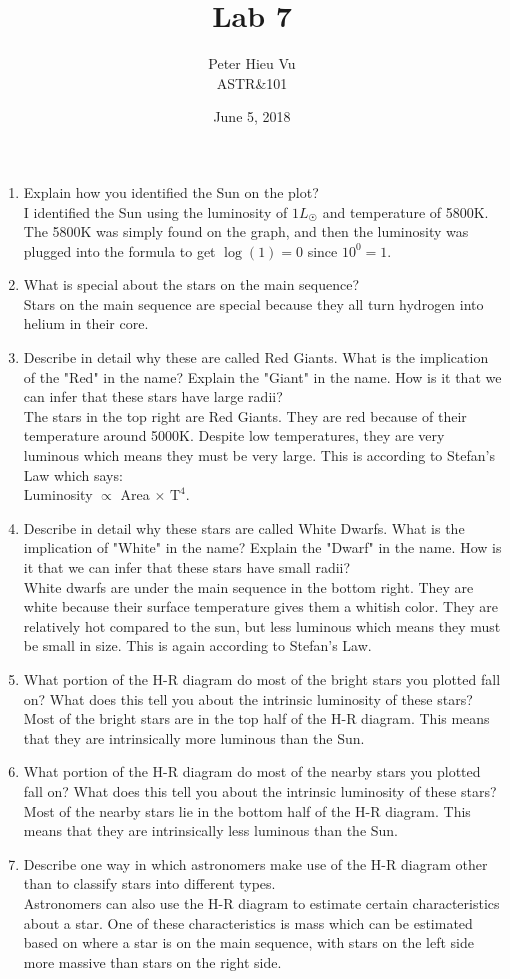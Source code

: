 \documentclass[12pt]{article}
\title{\vspace{-1.5cm}Lab 7}
\author{Peter Hieu Vu\\ASTR\&101}
\date{June 5, 2018}
\newcommand\lnend{\medskip\\}
\begin{document}
    \maketitle

    \begin{enumerate}
        \item Explain how you identified the Sun on the plot?\lnend{}
            I identified the Sun using the luminosity of $1L_{\Sun}$ and temperature of 5800K. The 5800K was simply found on the graph, and then the luminosity was plugged into the formula to get $\log (1) = 0$ since $10^0 = 1$.
        \item What is special about the stars on the main sequence?\lnend{}
            Stars on the main sequence are special because they all turn hydrogen into helium in their core.
        \item Describe in detail why these are called Red Giants. What is the implication of the "Red" in the name? Explain the "Giant" in the name. How is it that we can infer that these stars have large radii?\lnend{}
            The stars in the top right are Red Giants. They are red because of their temperature around 5000K. Despite low temperatures, they are very luminous which means they must be very large. This is according to Stefan's Law which says:\\Luminosity $\propto$ Area $\times$ $\mathrm{T}^4$.
        \item Describe in detail why these stars are called White Dwarfs. What is the implication of "White" in the name? Explain the "Dwarf" in the name. How is it that we can infer that these stars have small radii?\lnend{}
            White dwarfs are under the main sequence in the bottom right. They are white because their surface temperature gives them a whitish color. They are relatively hot compared to the sun, but less luminous which means they must be small in size. This is again according to Stefan's Law.
        \item What portion of the H-R diagram do most of the bright stars you plotted fall on? What does this tell you about the intrinsic luminosity of these stars?\lnend{}
            Most of the bright stars are in the top half of the H-R diagram. This means that they are intrinsically more luminous than the Sun.
        \item What portion of the H-R diagram do most of the nearby stars you plotted fall on? What does this tell you about the intrinsic luminosity of these stars?\lnend{}
            Most of the nearby stars lie in the bottom half of the H-R diagram. This means that they are intrinsically less luminous than the Sun.
        \item Describe one way in which astronomers make use of the H-R diagram other than to classify stars into different types.\lnend{}
            Astronomers can also use the H-R diagram to estimate certain characteristics about a star. One of these characteristics is mass which can be estimated based on where a star is on the main sequence, with stars on the left side more massive than stars on the right side. 
    \end{enumerate}
\end{document}

